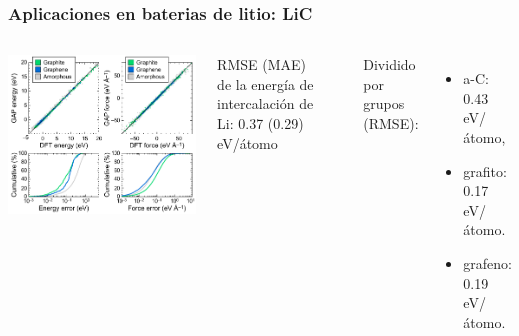 \documentclass[aspectratio=169]{beamer}
\begin{document}
    \begin{frame}
        \frametitle{Aplicaciones en baterias de litio: LiC}
        
        \begin{columns}
            \begin{center}
                \includegraphics[width=\columnwidth]{LiC-training_testing.png}
            \end{center}

            RMSE (MAE) de la energía de intercalación de Li: 0.37 (0.29) eV/átomo

            \ \pause

            Dividido por grupos (RMSE):
            \begin{itemize}
                \item a-C: 0.43 eV/átomo,
                \item grafito: 0.17 eV/átomo.
                \item grafeno: 0.19 eV/átomo.
            \end{itemize}
        \end{columns}
    \end{frame}
    
\end{document}
